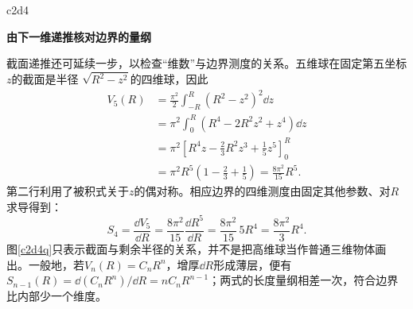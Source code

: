 \begin{drillsolution}{c2d4}

\par\medskip{}\noindent\textbf{由下一维递推核对边界的量纲}\par\nobreak
截面递推还可延续一步，以检查“维数”与边界测度的关系。五维球在固定第五坐标 $z$的截面是半径 $\sqrt{R^2-z^2}$的四维球，因此
\begin{align*}
V_5(R)&=\frac{\pi^2}{2}\int_{-R}^{R}(R^2-z^2)^2\dd z\\
&=\pi^2\int_0^R(R^4-2R^2z^2+z^4)\dd z\\
&=\pi^2\left[R^4z-\frac23R^2z^3+\frac15z^5\right]_0^R\\
&=\pi^2R^5\left(1-\frac23+\frac15\right)
=\frac{8\pi^2}{15}R^5.
\end{align*}
第二行利用了被积式关于$z$的偶对称。相应边界的四维测度由固定其他参数、对$R$求导得到：
\[
S_4=\frac{\dd V_5}{\dd R}
=\frac{8\pi^2}{15}\frac{\dd R^5}{\dd R}
=\frac{8\pi^2}{15}\,5R^4=\frac{8\pi^2}{3}R^4.
\]
图\ref{c2d4q}只表示截面与剩余半径的关系，并不是把高维球当作普通三维物体画出。一般地，若$V_n(R)=C_nR^n$，增厚$\dd R$形成薄层，便有$S_{n-1}(R)=\dd(C_nR^n)/\dd R=nC_nR^{n-1}$；两式的长度量纲相差一次，符合边界比内部少一个维度。
\end{drillsolution}
